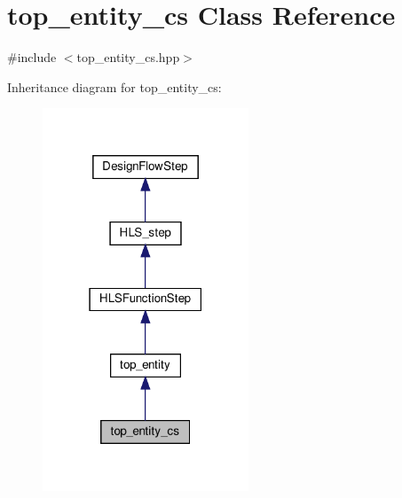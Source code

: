 \hypertarget{classtop__entity__cs}{}\section{top\+\_\+entity\+\_\+cs Class Reference}
\label{classtop__entity__cs}


{\ttfamily \#include $<$top\+\_\+entity\+\_\+cs.\+hpp$>$}



Inheritance diagram for top\+\_\+entity\+\_\+cs\+:
\nopagebreak
\begin{figure}[H]
\begin{center}
\leavevmode
\includegraphics[width=174pt]{dc/da8/classtop__entity__cs__inherit__graph}
\end{center}
\end{figure}


